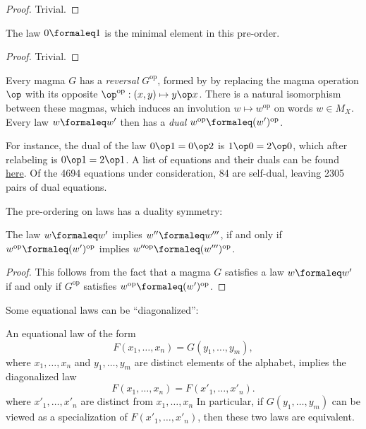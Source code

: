 \begin{proof}
  Trivial.
\end{proof}

\begin{lemma}\label{minimal}\leanok
  The law $0  \formaleq  1$ is the minimal element in this pre-order.
\end{lemma}

\begin{proof}
  Trivial.
\end{proof}

Every magma $G$ has a \emph{reversal} $G^{\mathrm{op}}$, formed by by replacing the magma operation
$\op$ with its opposite $\op^{\mathrm{op}}:(x,y) \mapsto y \op x$. There is a natural isomorphism
between these magmas, which induces an involution $w \mapsto w^{\mathrm{op}}$ on words $w \in M_X$.
Every law $w  \formaleq  w'$ then has a \emph{dual} $w^{\mathrm{op}}  \formaleq  (w')^{\mathrm{op}}$.

For instance, the dual of the law $0 \op 1 = 0 \op 2$ is $1 \op 0 = 2 \op 0$, which after relabeling
is $0 \op 1 = 2 \op 1$. A list of equations and their duals can be found
\href{https://github.com/teorth/equational_theories/blob/main/data/dual_equations.md}{here}.
Of the 4694 equations under consideration, 84 are self-dual, leaving 2305 pairs of dual equations.

The pre-ordering on laws has a duality symmetry:

\begin{lemma}\leanok\label{duality}
  The law $w \formaleq w'$ implies $w''\formaleq w'''$, if and only if $w^{\mathrm{op}} \formaleq (w')^{\mathrm{op}}$ implies $w''^{\mathrm{op}} \formaleq (w''')^{\mathrm{op}}$.
\end{lemma}

\begin{proof}
  This follows from the fact that a magma $G$ satisfies a law $w  \formaleq  w'$ if and only if $G^{\mathrm{op}}$ satisfies $w^{\mathrm{op}}  \formaleq  (w')^{\mathrm{op}}$.
\end{proof}

Some equational laws can be ``diagonalized'':

\begin{theorem}[Diagonalization]\label{diag}
  An equational law of the form
  \begin{equation}\label{prediag}
    F(x_1,\dots,x_n) = G(y_1,\dots,y_m),
  \end{equation}
  where $x_1,\dots,x_n$ and $y_1,\dots,y_m$ are distinct elements of the alphabet, implies the diagonalized law
  $$ F(x_1,\dots,x_n) = F(x'_1,\dots,x'_n).$$
  where $x'_1,\dots,x'_n$ are distinct from $x_1,\dots,x_n$
  In particular, if $G(y_1,\dots,y_m)$ can be viewed as a specialization of $F(x'_1,\dots,x'_n)$, then these two laws are equivalent.
\end{theorem}

